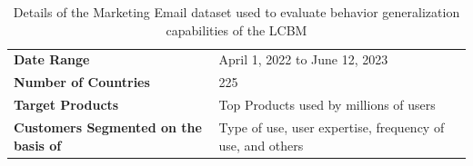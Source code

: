 \begin{table}[!t]
%     
\begin{minipage}{1.0\textwidth}\hspace{4pt}
\centering
\begin{adjustbox}{max width = 1.0\textwidth}\scriptsize
\begin{tabularx}{0.7\textwidth}{XX}\toprule[1.5pt]
\textbf{Date Range} & April 1, 2022 to June 12, 2023 \\
\textbf{Number of Countries} & 225 \\
\textbf{Target Products} & Top Products used by millions of users\\ %
\textbf{Customers Segmented on the basis of} & Type of use, user expertise, frequency of use, and others\\
\bottomrule[1.5pt]
\end{tabularx}
\end{adjustbox}
\caption{Details of the \companyName Marketing Email dataset used to evaluate behavior generalization capabilities of the LCBM
\label{table:email dataset}}
\end{minipage}
\end{table}   






